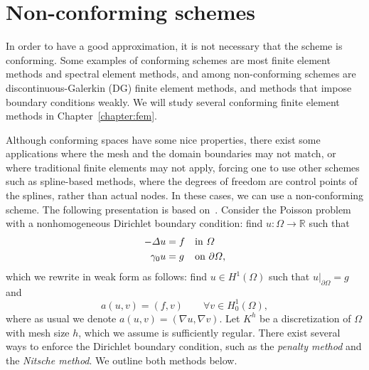 \section{Non-conforming schemes}\label{sec:non-conforming-schemes}
In order to have a good approximation, it is not necessary that the scheme is conforming. Some examples of conforming schemes are most finite element methods and spectral element methods, and among non-conforming schemes are discontinuous-Galerkin (DG) finite element methods, and methods that impose boundary conditions weakly. We will study several conforming finite element methods in Chapter~\ref{chapter:fem}. 

Although conforming spaces have some nice properties, there exist some applications where the mesh and the domain boundaries may not match, or where traditional finite elements may not apply, forcing one to use other schemes such as spline-based methods, where the degrees of freedom are control points of the splines, rather than actual nodes. In these cases, we can use a non-conforming scheme. The following presentation is based on~\cite{Chouly2024}. Consider the Poisson problem with a nonhomogeneous Dirichlet boundary condition: find $u:\Omega\to \mathbb{R}$ such that
\begin{equation}
    \begin{aligned}
        -\Delta u &= f &&\text{in } \Omega \\
        \gamma_0 u &= g &&\text{on } \partial\Omega,
    \end{aligned}
\end{equation}
which we rewrite in weak form as follows: find $u\in H^1(\Omega)$ such that $u|_{\partial\Omega} = g$ and
\begin{equation}
    a(u,v) = (f,v) \qquad \forall v\in H_0^1(\Omega),
\end{equation}
where as usual we denote $a(u,v)=(\nabla u,\nabla v)$. Let $K^h$ be a discretization of $\Omega$ with mesh size $h$, which we assume is sufficiently regular. There exist several ways to enforce the Dirichlet boundary condition, such as the \emph{penalty method} and the \emph{Nitsche method}. We outline both methods below.
